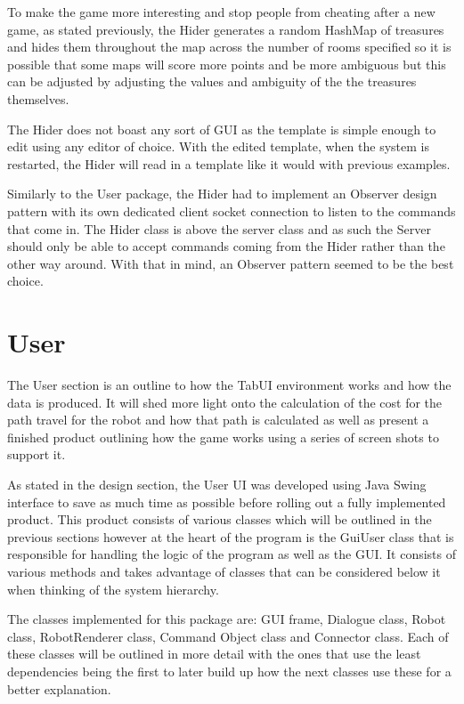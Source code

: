     To make the game more interesting and stop people from cheating after a new game, as stated previously, the Hider generates a random HashMap of treasures and hides them throughout the map across the number of rooms specified so it is possible that some maps will score more points and be more ambiguous but this can be adjusted by adjusting the values and ambiguity of the the treasures themselves.

    The Hider does not boast any sort of GUI as the template is simple enough to edit using any editor of choice. With the edited template, when the system is restarted, the Hider will read in a template like it would with previous examples.

    Similarly to the User package, the Hider had to implement an Observer design pattern with its own dedicated client socket connection to listen to the commands that come in. The Hider class is above the server class and as such the Server should only be able to accept commands coming from the Hider rather than the other way around. With that in mind, an Observer pattern seemed to be the best choice.

  \section{User}
    The User section is an outline to how the TabUI environment works and how the data is produced. It will shed more light onto the calculation of the cost for the path travel for the robot and how that path is calculated as well as present a finished product outlining how the game works using a series of screen shots to support it.

    As stated in the design section, the User UI was developed using Java Swing interface to save as much time as possible before rolling out a fully implemented product. This product consists of various classes which will be outlined in the previous sections however at the heart of the program is the GuiUser class that is responsible for handling the logic of the program as well as the GUI. It consists of various methods and takes advantage of classes that can be considered below it when thinking of the system hierarchy.

    The classes implemented for this package are: GUI frame, Dialogue class, Robot class, RobotRenderer class, Command Object class and Connector class. Each of these classes will be outlined in more detail with the ones that use the least dependencies being the first to later build up how the next classes use these for a better explanation.

